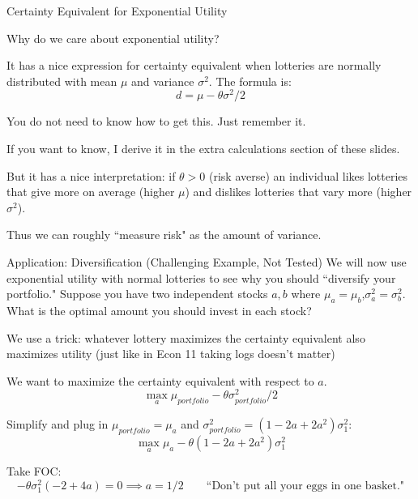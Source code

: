 \documentclass[aspectratio=169]{beamer}
\newenvironment{wideitemize}{\itemize\addtolength{\itemsep}{10pt}}{\enditemize}
\begin{document}
\begin{frame}{Certainty Equivalent for Exponential Utility}
\begin{wideitemize}
    \item Why do we care about exponential utility?
    \item It has a nice expression for certainty equivalent when lotteries are normally distributed with mean $\mu$ and variance $\sigma^2$. The formula is:
    \[d = \mu - \theta \sigma^2/2\]
    \item You do not need to know how to get this. Just remember it.
    \item If you want to know, I derive it in the extra calculations section of these slides.
    \item But it has a nice interpretation: if $\theta>0$ (risk averse) an individual likes lotteries that give more on average (higher $\mu$) and dislikes lotteries that vary more (higher $\sigma^2$).
    
    \item Thus we can roughly ``measure risk" as the amount of variance.
\end{wideitemize}
    
\end{frame}

\begin{frame}{Application: Diversification (Challenging Example, Not Tested)}
    We will now use exponential utility with normal lotteries to see why you should ``diversify your portfolio." Suppose you have two independent stocks $a,b$ where $\mu_a=\mu_b$,$\sigma^2_a=\sigma^2_b$. What is the optimal amount you should invest in each stock?
    
    \begin{wideitemize}
        \item We use a trick: whatever lottery maximizes the certainty equivalent also maximizes utility (just like in Econ 11 taking logs doesn't matter)
        \item We want to maximize the certainty equivalent with respect to $a$.
        \[\max_a \mu_{portfolio} - \theta \sigma_{portfolio} ^2/2 \]
        \item Simplify and plug in $\mu_{portfolio}=\mu_a$ and $\sigma^2_{portfolio}=(1-2a+2a^2)\sigma_1^2$:
        \[\max_a \mu_a - \theta (1-2a+2a^2)\sigma_1^2\]
        \item Take FOC:
        \[-\theta\sigma_1^2(-2+4a)=0 \implies a = 1/2 \qquad \text{``Don't put all your eggs in one basket."}\]

    \end{wideitemize}
    
\end{frame}
\end{document}
